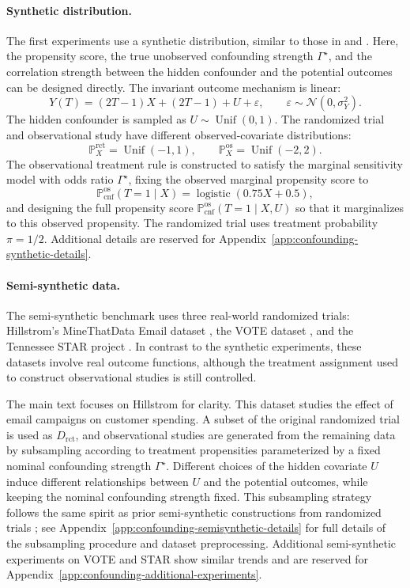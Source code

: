 \paragraph{Synthetic distribution.}
The first experiments use a synthetic distribution, similar to those in \citet{yadlowsky2022bounds} and \citet{jin2023sensitivity}. Here, the propensity score, the true unobserved confounding strength \(\Gamma^{\star}\), and the correlation strength between the hidden confounder and the potential outcomes can be designed directly. The invariant outcome mechanism is linear:
\[
  Y(T)
  =
  (2T-1)X+(2T-1)+U+\varepsilon,
  \qquad
  \varepsilon\sim\mathcal{N}(0,\sigma_Y^2).
\]
The hidden confounder is sampled as \(U\sim\operatorname{Unif}(0,1)\). The randomized trial and observational study have different observed-covariate distributions:
\[
  \mathbb{P}^{\mathrm{rct}}_X=\operatorname{Unif}(-1,1),
  \qquad
  \mathbb{P}^{\mathrm{os}}_X=\operatorname{Unif}(-2,2).
\]
The observational treatment rule is constructed to satisfy the marginal sensitivity model with odds ratio \(\Gamma^{\star}\), fixing the observed marginal propensity score to
\[
  \mathbb{P}^{\mathrm{os}}_{\mathrm{cnf}}(T=1\mid X)
  =
  \operatorname{logistic}(0.75X + 0.5),
\]
and designing the full propensity score \(\mathbb{P}^{\mathrm{os}}_{\mathrm{cnf}}(T=1\mid X,U)\) so that it marginalizes to this observed propensity. The randomized trial uses treatment probability \(\pi=1/2\). Additional details are reserved for Appendix~\ref{app:confounding-synthetic-details}.

\paragraph{Semi-synthetic data.}
The semi-synthetic benchmark uses three real-world randomized trials: Hillstrom's MineThatData Email dataset \citep{hillstrom2008}, the VOTE dataset \citep{gerber2008social}, and the Tennessee STAR project \citep{word1990state}. In contrast to the synthetic experiments, these datasets involve real outcome functions, although the treatment assignment used to construct observational studies is still controlled.

The main text focuses on Hillstrom for clarity. This dataset studies the effect of email campaigns on customer spending. A subset of the original randomized trial is used as \(D_{\mathrm{rct}}\), and observational studies are generated from the remaining data by subsampling according to treatment propensities parameterized by a fixed nominal confounding strength \(\Gamma^{\star}\). Different choices of the hidden covariate \(U\) induce different relationships between \(U\) and the potential outcomes, while keeping the nominal confounding strength fixed. This subsampling strategy follows the same spirit as prior semi-synthetic constructions from randomized trials \citep{gentzel2021and,keith2023rct}; see Appendix~\ref{app:confounding-semisynthetic-details} for full details of the subsampling procedure and dataset preprocessing. Additional semi-synthetic experiments on VOTE and STAR show similar trends and are reserved for Appendix~\ref{app:confounding-additional-experiments}.

